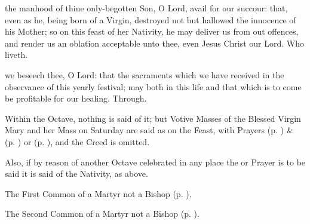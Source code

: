 
\secret
{} the manhood of thine only-begotten Son, O Lord, avail for our succour: that, even as he, being born of a Virgin, destroyed not but hallowed the innocence of his Mother; so on this feast of her Nativity, he may deliver us from out offences, and render us an oblation acceptable unto thee, even Jesus Christ our Lord. Who liveth.


\postcommunion
{} we beseech thee, O Lord: that the sacraments which we have received in the observance of this yearly festival; may both in this life and that which is to come be profitable for our healing. Through.

\begin{rubric}
    Within the Octave, nothing is said of it; but Votive Masses of the Blessed Virgin Mary and her Mass on Saturday are said as on the Feast, with   Prayers  (p. \pageref{SPHolyGhost}) \&   (p. \pageref{SPAgainst}) or  (p. \pageref{SPChiefBishop}), and the Creed is omitted.
\end{rubric}
\begin{rubric}
    Also, if by reason of another Octave celebrated in any place the  or  Prayer is to be said  it is said of the Nativity, as above.
\end{rubric}



\begin{rubric}
	The First Common of a Martyr not a Bishop (p. \pageref{CommonMartyrNotBishopI}).
\end{rubric}



\begin{rubric}
	The Second Common of a Martyr not a Bishop (p. \pageref{CommonMartyrNotBishopII}).
\end{rubric}

